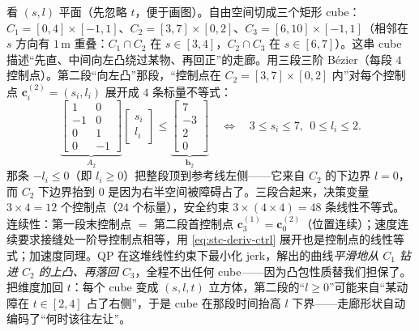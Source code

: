 \begin{example}\label{ex:stc-qp}
看 $(s,l)$ 平面（先忽略 $t$，便于画图）。自由空间切成三个矩形 cube：$C_1=[0,4]\times[-1,1]$、$C_2=[3,7]\times[0,2]$、$C_3=[6,10]\times[-1,1]$（相邻在 $s$ 方向有 $1\,\mathrm{m}$ 重叠：$C_1\cap C_2$ 在 $s\in[3,4]$，$C_2\cap C_3$ 在 $s\in[6,7]$）。这串 cube 描述“先直、中间向左凸绕过某物、再回正”的走廊。用三段三阶 Bézier（每段 $4$ 控制点）。第二段“向左凸”那段，“控制点在 $C_2=[3,7]\times[0,2]$ 内”对每个控制点 $\mathbf{c}_i^{(2)}=(s_i,l_i)$ 展开成 $4$ 条标量不等式：
\begin{equation}
  \underbrace{\begin{bmatrix} 1&0\\ -1&0\\ 0&1\\ 0&-1\end{bmatrix}}_{A_2}\begin{bmatrix} s_i\\ l_i\end{bmatrix}\le\underbrace{\begin{bmatrix} 7\\ -3\\ 2\\ 0\end{bmatrix}}_{\mathbf{b}_2}\quad\Longleftrightarrow\quad 3\le s_i\le 7,\ \ 0\le l_i\le 2.
  \label{eq:stc-cube-c2}
\end{equation}
那条 $-l_i\le0$（即 $l_i\ge0$）把整段顶到参考线左侧——它来自 $C_2$ 的下边界 $l=0$，而 $C_2$ 下边界抬到 $0$ 是因为右半空间被障碍占了。三段合起来，决策变量 $3\times4=12$ 个控制点（$24$ 个标量），安全约束 $3\times(4\times4)=48$ 条线性不等式。连续性：第一段末控制点 $=$ 第二段首控制点 $\mathbf{c}_3^{(1)}=\mathbf{c}_0^{(2)}$（位置连续）；速度连续要求接缝处一阶导控制点相等，用 \cref{eq:stc-deriv-ctrl} 展开也是控制点的线性等式；加速度同理。QP 在这堆线性约束下最小化 jerk，解出的曲线\emph{平滑地从 $C_1$ 钻进 $C_2$ 的上凸、再落回 $C_3$}，全程不出任何 cube——因为凸包性质替我们担保了。把维度加回 $t$：每个 cube 变成 $(s,l,t)$ 立方体，第二段的“$l\ge0$”可能来自“某动障在 $t\in[2,4]$ 占了右侧”，于是 cube 在那段时间抬高 $l$ 下界——走廊形状自动编码了“何时该往左让”。
\end{example}

